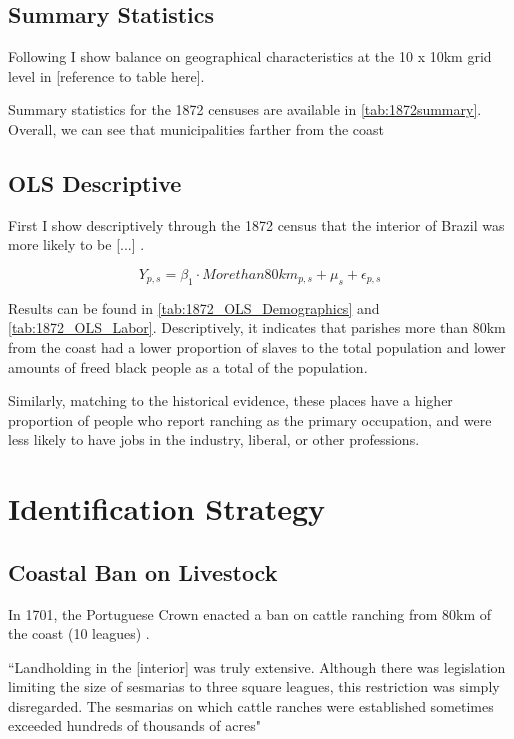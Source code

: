 \documentclass{article}
\begin{document}
\subsection{Summary Statistics}

Following \textcite{Lowes2021-ww} I show balance on geographical characteristics at the 10 x 10km grid level in [reference to table here].

Summary statistics for the 1872 censuses are available in \autoref{tab:1872summary}. Overall, we can see that municipalities farther from the coast 

\subsection{OLS Descriptive}

First I show descriptively through the 1872 census that the interior of Brazil was more likely to be [...] \parencite{Laudares2022-vy}.

\begin{equation}
  Y_{p,s} = \beta_1 \cdot Morethan80km_{p,s} + \mu_s + \epsilon_{p,s}
\end{equation}

Results can be found in \autoref{tab:1872_OLS_Demographics} and \autoref{tab:1872_OLS_Labor}. Descriptively, it indicates that parishes more than 80km from the coast had a lower proportion of slaves to the total population and lower amounts of freed black people as a total of the population.

Similarly, matching to the historical evidence, these places have a higher proportion of people who report ranching as the primary occupation, and were less likely to have jobs in the industry, liberal, or other professions. 

\section{Identification Strategy}

\subsection{Coastal Ban on Livestock}

In 1701, the Portuguese Crown enacted a ban on cattle ranching from 80km of the coast (10 leagues) \parencites[p~.40]{Fausto2014-bh}[p~.198]{Simonsen2005-ps}[p~.460]{Bethell1984-of}.

\textcite{Bethell1984-of} ``Landholding in the [interior] was truly extensive. Although there was legislation limiting the size of sesmarias to three square leagues, this restriction was simply disregarded. The sesmarias on which cattle ranches were established sometimes exceeded hundreds of thousands of acres"
\end{document}
